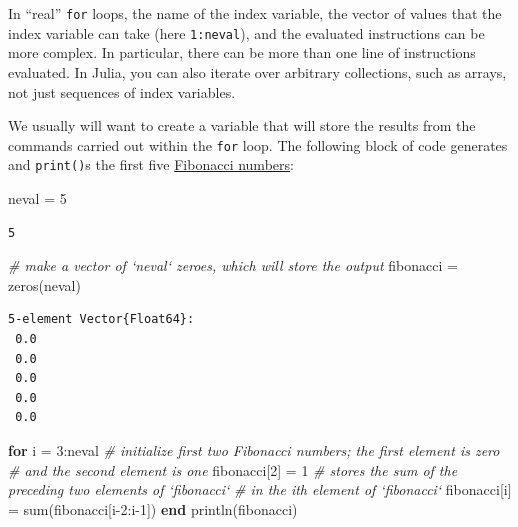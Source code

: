 \documentclass[
  11pt,
]{book}
\newenvironment{Shaded}{\begin{snugshade}}{\end{snugshade}}
\newcommand{\CommentTok}[1]{\textcolor[rgb]{0.37,0.37,0.37}{\textit{#1}}}
\newcommand{\FloatTok}[1]{\textcolor[rgb]{0.06,0.06,0.06}{#1}}
\newcommand{\KeywordTok}[1]{\textcolor[rgb]{0.27,0.27,0.27}{\textbf{#1}}}
\newcommand{\NormalTok}[1]{#1}
\begin{document}
In \enquote{real} \texttt{for} loops, the name of the index variable, the vector of values that the index variable can take (here \texttt{1:neval}), and the evaluated instructions can be more complex. In particular, there can be more than one line of instructions evaluated. In Julia, you can also iterate over arbitrary collections, such as arrays, not just sequences of index variables.

We usually will want to create a variable that will store the results from the commands carried out within the \texttt{for} loop. The following block of code generates and \texttt{print()}s the first five \href{https://en.wikipedia.org/wiki/Fibonacci_number}{Fibonacci numbers}:

\begin{Shaded}
\begin{Highlighting}[]
\NormalTok{neval = }\FloatTok{5} 
\end{Highlighting}
\end{Shaded}

\begin{verbatim}
5
\end{verbatim}

\begin{Shaded}
\begin{Highlighting}[]
 \CommentTok{# make a vector of `neval` zeroes, which will store the output}
\NormalTok{fibonacci = zeros(neval)}
\end{Highlighting}
\end{Shaded}

\begin{verbatim}
5-element Vector{Float64}:
 0.0
 0.0
 0.0
 0.0
 0.0
\end{verbatim}

\begin{Shaded}
\begin{Highlighting}[]
\KeywordTok{for}\NormalTok{ i = }\FloatTok{3}\NormalTok{:neval}
  \CommentTok{# initialize first two Fibonacci numbers; the first element is zero }
  \CommentTok{# and the second element is one}
\NormalTok{  fibonacci[}\FloatTok{2}\NormalTok{] = }\FloatTok{1}
  \CommentTok{# stores the sum of the preceding two elements of `fibonacci` }
  \CommentTok{# in the ith element of `fibonacci`}
\NormalTok{  fibonacci[i] = sum(fibonacci[i-}\FloatTok{2}\NormalTok{:i-}\FloatTok{1}\NormalTok{])}
\KeywordTok{end}
\NormalTok{println(fibonacci)}
\end{Highlighting}
\end{Shaded}
\end{document}
